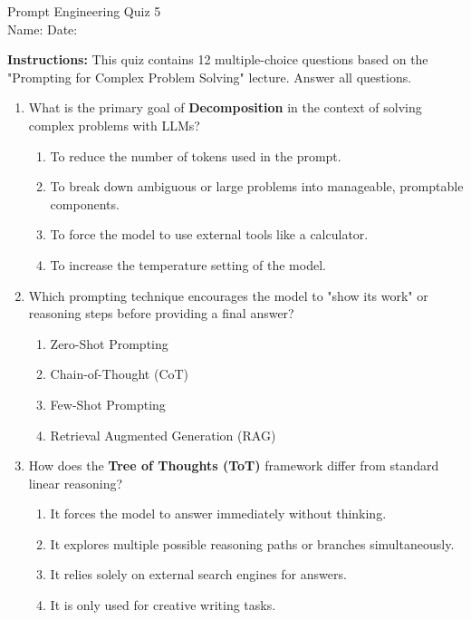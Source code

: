 \documentclass[11pt,a4paper]{article}
\begin{document}
\begin{center}
  {\LARGE Prompt Engineering \textemdash{} Quiz 5}\\[6pt]
  {\large Name: \underline{\hspace{6cm}} \quad Date: \underline{\hspace{3cm}}}
\end{center}
\vspace{0.5cm}

\textbf{Instructions:} This quiz contains 12 multiple-choice questions based on the "Prompting for Complex Problem Solving" lecture. Answer all questions. 
\vspace{0.5cm}

\begin{enumerate}[leftmargin=*, label=\textbf{\#\arabic*}]

  \item What is the primary goal of \textbf{Decomposition} in the context of solving complex problems with LLMs?
    \begin{enumerate}[label=\Alph*)]
      \item To reduce the number of tokens used in the prompt.
      \item To break down ambiguous or large problems into manageable, promptable components.
      \item To force the model to use external tools like a calculator.
      \item To increase the temperature setting of the model.
    \end{enumerate}

  \item Which prompting technique encourages the model to "show its work" or reasoning steps before providing a final answer?
    \begin{enumerate}[label=\Alph*)]
      \item Zero-Shot Prompting
      \item Chain-of-Thought (CoT)
      \item Few-Shot Prompting
      \item Retrieval Augmented Generation (RAG)
    \end{enumerate}

  \item How does the \textbf{Tree of Thoughts (ToT)} framework differ from standard linear reasoning?
    \begin{enumerate}[label=\Alph*)]
      \item It forces the model to answer immediately without thinking.
      \item It explores multiple possible reasoning paths or branches simultaneously.
      \item It relies solely on external search engines for answers.
      \item It is only used for creative writing tasks.
    \end{enumerate}


\end{enumerate}
\end{document}
